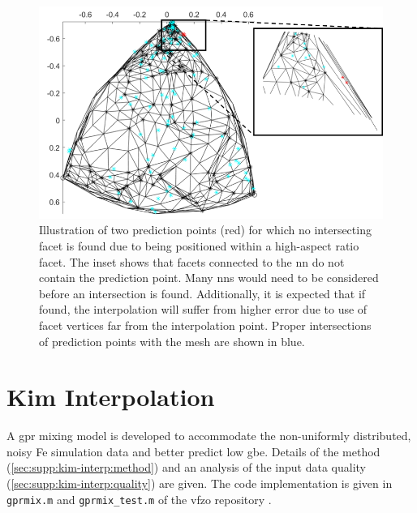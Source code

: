 \documentclass[preprint,12pt]{elsarticle}
\newcommand{\outpt}{prediction}
\newcommand{\vfzorepo}{\gls{vfzo} repository}
\begin{document}
\begin{figure}
    \centering
    \includegraphics[scale=1]{figures/high-aspect-non-int.png}
    \caption{Illustration of two \outpt{} points (red) for which no intersecting facet is found due to being positioned within a high-aspect ratio facet. The inset shows that facets connected to the \gls{nn} do not contain the \outpt{} point. Many \glspl{nn} would need to be considered before an intersection is found. Additionally, it is expected that if found, the interpolation will suffer from higher error due to use of facet vertices far from the interpolation point. Proper intersections of \outpt{} points with the mesh are shown in blue.}
    \label{fig:high-aspect-non-int}
\end{figure}



\section{Kim Interpolation}
\label{sec:supp:kim-interp}

A \gls{gpr} mixing model is developed to accommodate the non-uniformly distributed, noisy Fe simulation data \cite{kimPhasefieldModeling3D2014} and better predict low \gls{gbe}. Details of the method (\cref{sec:supp:kim-interp:method}) and an analysis of the input data quality (\cref{sec:supp:kim-interp:quality}) are given. The code implementation is given in \texttt{gprmix.m} and \texttt{gprmix\_test.m} of the \vfzorepo{} \cite{bairdFiveDegreeofFreedom5DOF2020}.
\end{document}
